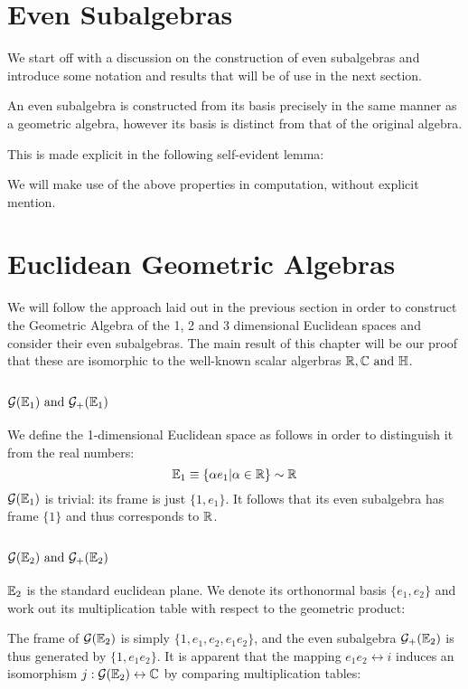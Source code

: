 \section{Even Subalgebras}
We start off with a discussion on the construction of even subalgebras and introduce some notation and results that will be of use in the next section.

An even subalgebra is constructed from its basis precisely in the same manner as a geometric algebra, however its basis is distinct from that of the original algebra.

This is made explicit in the following self-evident lemma:

We will make use of the above properties in computation, without explicit mention.



\section{Euclidean Geometric Algebras}
We will follow the approach laid out in the previous section in order to construct the Geometric Algebra of the 1, 2 and 3 dimensional Euclidean spaces and consider their even subalgebras.
The main result of this chapter will be our proof that these are isomorphic to the well-known scalar algerbras $\R, \C \mathrm{\ and\ } \HM$.

\subsection{$\G(\E_1)\ \mathrm{and}\ \G_+(\E_1)$}

We define the 1-dimensional Euclidean space as follows in order to distinguish it from the real numbers:
\[\mathbb{E}_1 \equiv \{\alpha e_1 | \alpha \in \mathbb{R}\} \sim \mathbb{R}\]
$\mathcal{G}(\mathbb{E}_1)$  is trivial: its frame is just $\{1, e_1\}$.
It follows that its even subalgebra has frame $\{1\}$ and thus corresponds to $\mathbb{R}$.

\subsection{$\G(\E_2)\ \mathrm{and}\ \G_+(\E_2)$}

$\mathbb{E}_2$ is the standard euclidean plane. We denote its orthonormal basis $\{e_1, e_2\}$ and work out its multiplication table with respect to the geometric product:


The frame of $\mathcal{G}(\mathbb{E}_2)$ is simply $\{1, e_1, e_2, e_1e_2\}$, and the even subalgebra $\mathcal{G}_+(\mathbb{E}_2)$ is thus generated by $\{1, e_1e_2 \}$.
It is apparent that the mapping $e_1e_2 \leftrightarrow i$ induces an isomorphism $j : \mathcal{G}(\mathbb{E}_2) \leftrightarrow \mathbb{C}$ by comparing multiplication tables:


